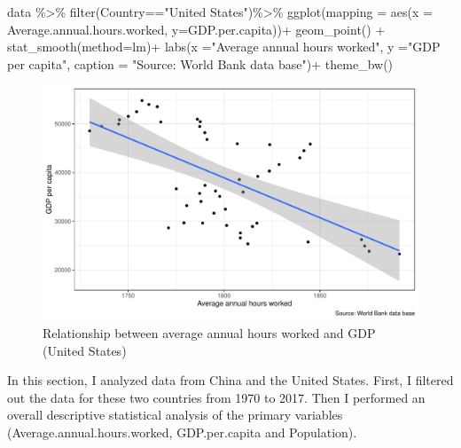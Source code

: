 \documentclass[11pt,a4paper,]{article}
\newenvironment{Shaded}{\begin{snugshade}}{\end{snugshade}}
\newcommand{\AttributeTok}[1]{\textcolor[rgb]{0.77,0.63,0.00}{#1}}
\newcommand{\FunctionTok}[1]{\textcolor[rgb]{0.00,0.00,0.00}{#1}}
\newcommand{\NormalTok}[1]{#1}
\newcommand{\SpecialCharTok}[1]{\textcolor[rgb]{0.00,0.00,0.00}{#1}}
\newcommand{\StringTok}[1]{\textcolor[rgb]{0.31,0.60,0.02}{#1}}
\begin{document}
\begin{Shaded}
\begin{Highlighting}[]
\NormalTok{data }\SpecialCharTok{\%\textgreater{}\%}
    \FunctionTok{filter}\NormalTok{(Country}\SpecialCharTok{==}\StringTok{"United States"}\NormalTok{)}\SpecialCharTok{\%\textgreater{}\%}
    \FunctionTok{ggplot}\NormalTok{(}\AttributeTok{mapping =} \FunctionTok{aes}\NormalTok{(}\AttributeTok{x =}\NormalTok{ Average.annual.hours.worked,}
                          \AttributeTok{y=}\NormalTok{GDP.per.capita))}\SpecialCharTok{+}
    \FunctionTok{geom\_point}\NormalTok{() }\SpecialCharTok{+} 
    \FunctionTok{stat\_smooth}\NormalTok{(}\AttributeTok{method=}\NormalTok{lm)}\SpecialCharTok{+}
  \FunctionTok{labs}\NormalTok{(}\AttributeTok{x =}\StringTok{"Average annual hours worked"}\NormalTok{, }
       \AttributeTok{y =}\StringTok{"GDP per capita"}\NormalTok{, }
       \AttributeTok{caption =} \StringTok{"Source: World Bank data base"}\NormalTok{)}\SpecialCharTok{+}
    \FunctionTok{theme\_bw}\NormalTok{()}
\end{Highlighting}
\end{Shaded}

\begin{figure}
\centering
\includegraphics{report_files/figure-latex/Figure4-1.pdf}
\caption{\label{fig:Figure4}Relationship between average annual hours worked and GDP (United States)}
\end{figure}

In this section, I analyzed data from China and the United States. First, I filtered out the data for these two countries from 1970 to 2017. Then I performed an overall descriptive statistical analysis of the primary variables (Average.annual.hours.worked, GDP.per.capita and Population).
\end{document}
